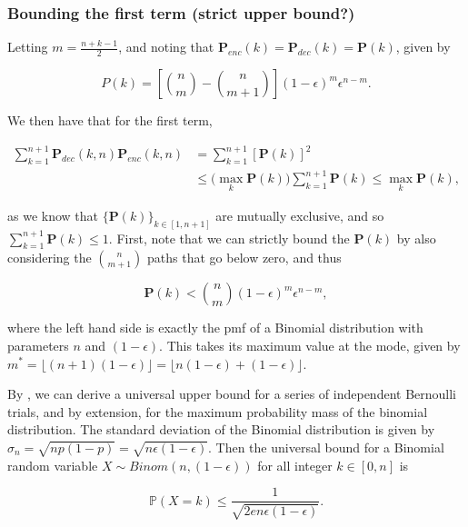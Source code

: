 \documentclass{article}
\newcommand{\eps}{\epsilon}
\begin{document}
\colorbox{blue!10}{
\begin{minipage}{\textwidth}
\subsubsection*{Bounding the first term (strict upper bound?)}

Letting $m = \frac{n+k-1}{2}$, and noting that $\mathbf{P}_{enc}(k) = \mathbf{P}_{dec}(k) = \mathbf{P}(k)$, given by 


$$P(k) = \left[ \binom{n}{m} - \binom{n}{m+1} \right] (1-\epsilon)^m \epsilon^{n-m}.$$

We then have that for the first term,

\begin{align*}
    \sum_{k=1}^{n+1} \mathbf{P}_{dec}(k, n) \mathbf{P}_{enc}(k, n) &= \sum_{k=1}^{n+1} [\mathbf{P}(k)]^2 \\
    &\leq \big(\max_k \mathbf{P}(k)\big) \sum_{k=1}^{n+1} \mathbf{P}(k) \leq \max_k \mathbf{P}(k),
\end{align*}

as we know that $\{\mathbf{P}(k)\}_{k \in [1,n+1]}$ are mutually exclusive, and so $\sum_{k=1}^{n+1} \mathbf{P}(k) \leq 1$. First, note that we can strictly bound the $\mathbf{P}(k)$ by also considering the $\binom{n}{m+1}$ paths that go below zero, and thus 

$$\mathbf{P}(k) < \binom{n}{m}  (1-\epsilon)^m \epsilon^{n-m},$$

where the left hand side is exactly the pmf of a Binomial distribution with parameters $n$ and $(1-\eps)$. This takes its maximum value at the mode, given by $m^*=\lfloor (n+1) (1-\eps)\rfloor = \lfloor n(1-\eps) + (1-\eps)\rfloor$. 

By \cite{BAILLON_COMINETTI_VAISMAN_2016}, we can derive a universal upper bound for a series of independent Bernoulli trials, and by extension, for the maximum probability mass of the binomial distribution. The standard deviation of the Binomial distribution is given by $\sigma_n = \sqrt{np(1-p)} = \sqrt{n\eps(1-\eps)}$. Then the universal bound for a Binomial random variable $X \sim Binom(n,(1-\eps))$ for all integer $k \in [0,n]$ is 

$$
\mathbb{P}(X = k) \leq \frac{1}{\sqrt{2en\eps(1-\eps)}}.
$$






\end{minipage}}

\newpage
\end{document}
